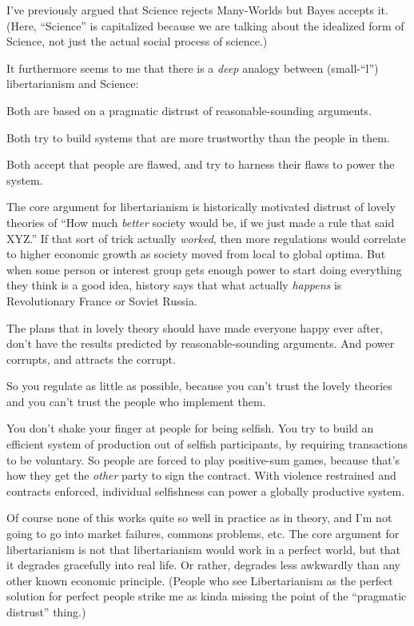 {
 I've previously argued that Science rejects
Many-Worlds but Bayes accepts it. (Here,
``Science'' is capitalized because
we are talking about the idealized form of Science, not just the actual
social process of science.)}

{
 It furthermore seems to me that there is a \textit{deep} analogy
between (small-``l'') libertarianism
and Science:}

{
 Both are based on a pragmatic distrust of reasonable-sounding
arguments.}

{
 Both try to build systems that are more trustworthy than the
people in them.}

{
 Both accept that people are flawed, and try to harness their flaws
to power the system.}

{
 The core argument for libertarianism is historically motivated
distrust of lovely theories of ``How much
\textit{better} society would be, if we just made a rule that said
XYZ.'' If that sort of trick actually
\textit{worked}, then more regulations would correlate to higher
economic growth as society moved from local to global optima. But when
some person or interest group gets enough power to start doing
everything they think is a good idea, history says that what actually
\textit{happens} is Revolutionary France or Soviet Russia.}

{
 The plans that in lovely theory should have made everyone happy
ever after, don't have the results predicted by
reasonable-sounding arguments. And power corrupts, and attracts the
corrupt.}

{
 So you regulate as little as possible, because you
can't trust the lovely theories and you
can't trust the people who implement them.}

{
 You don't shake your finger at people for being
selfish. You try to build an efficient system of production out of
selfish participants, by requiring transactions to be voluntary. So
people are forced to play positive-sum games, because
that's how they get the \textit{other} party to sign
the contract. With violence restrained and contracts enforced,
individual selfishness can power a globally productive system.}

{
 Of course none of this works quite so well in practice as in
theory, and I'm not going to go into market failures,
commons problems, etc. The core argument for libertarianism is not that
libertarianism would work in a perfect world, but that it degrades
gracefully into real life. Or rather, degrades less awkwardly than any
other known economic principle. (People who see Libertarianism as the
perfect solution for perfect people strike me as kinda missing the
point of the ``pragmatic distrust''
thing.)}


